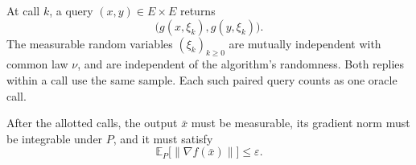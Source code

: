 \documentclass[10pt]{article}
\theoremstyle{definition}
\begin{document}
At call $k$, a query $(x,y)\in E\times E$ returns
\[
\bigl(g(x,\xi_k),g(y,\xi_k)\bigr).
\]
The measurable random variables $(\xi_k)_{k\geq0}$ are mutually independent with common law $\nu$, and are independent of the algorithm's randomness. Both replies within a call use the same sample. Each such paired query counts as one oracle call.

After the allotted calls, the output $\bar{x}$ must be measurable, its gradient norm must be integrable under $P$, and it must satisfy
\[
\mathbb{E}_{P}\bigl[\|\nabla f(\bar{x})\|\bigr]\leq\varepsilon.
\]
\end{document}
